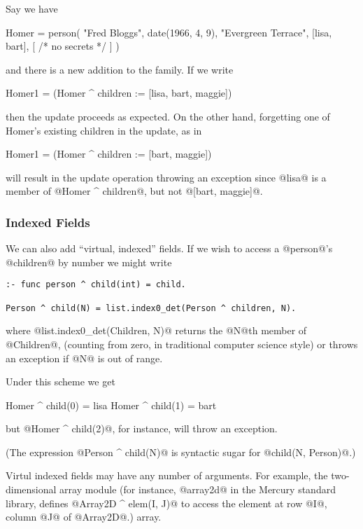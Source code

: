 Say we have 
\begin{myverbatim}
    Homer = person(
               "Fred Bloggs",
               date(1966, 4, 9),
               "Evergreen Terrace",
               [lisa, bart],
               [ /* no secrets */ ]
           )
\end{myverbatim}
and there is a new addition to the family.  If we write
\begin{myverbatim}
    Homer1 = (Homer ^ children := [lisa, bart, maggie])
\end{myverbatim}
then the update proceeds as expected.  On the other hand, forgetting one of
Homer's existing children in the update, as in
\begin{myverbatim}
    Homer1 = (Homer ^ children := [bart, maggie])
\end{myverbatim}
will result in the update operation throwing an exception since @lisa@ is a
member of @Homer ^ children@, but not @[bart, maggie]@.

\subsubsection{Indexed Fields}

We can also add ``virtual, indexed'' fields.  If we wish to
access a @person@'s @children@ by number we might write
\begin{verbatim}
:- func person ^ child(int) = child.

Person ^ child(N) = list.index0_det(Person ^ children, N).
\end{verbatim}
where @list.index0_det(Children, N)@ returns the @N@th member of @Children@,
(counting from zero, in traditional computer science style) or
throws an exception if @N@ is out of range.

Under this scheme we get
\begin{myverbatim}
    Homer ^ child(0) = lisa
    Homer ^ child(1) = bart
\end{myverbatim}
but @Homer ^ child(2)@, for instance, will throw an exception.

(The expression @Person ^ child(N)@ is syntactic sugar for
@child(N, Person)@.)


Virtul indexed fields may have any number of arguments.  For example, the
two-dimensional array module (for instance, @array2d@ in the Mercury
standard library, defines @Array2D ^ elem(I, J)@ to access the element at
row @I@, column @J@ of @Array2D@.)
array.

